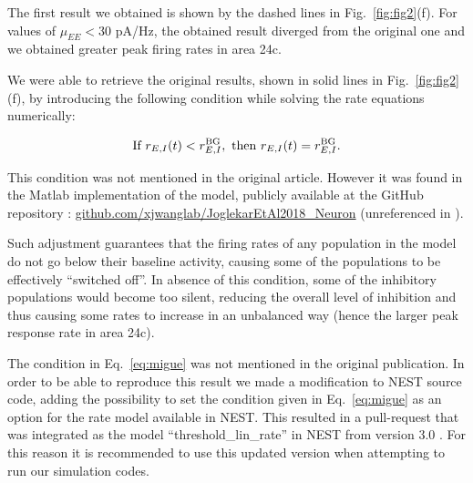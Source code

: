 The first result we obtained is shown by the dashed lines in Fig.~\ref{fig:fig2}(f). For values of $\mu_{EE} < 30$ pA/Hz, the obtained result diverged from the original one and we obtained greater peak firing rates in area 24c.

We were able to retrieve the original results, shown in solid lines in Fig.~\ref{fig:fig2}(f), by introducing the following condition while solving the rate equations numerically:

\begin{equation}
    \text{If } r_{E,I}(t) < r_{E,I}^{\rm BG}, \text{ then } r_{E,I}(t) = r_{E,I}^{\rm BG}.
    \label{eq:migue}
\end{equation}

This condition was not mentioned in the original article. However it was found in the Matlab implementation of the model, publicly available  at the GitHub repository : \href{github.com/xjwanglab/JoglekarEtAl2018_Neuron}{github.com/xjwanglab/JoglekarEtAl2018\_Neuron} (unreferenced in \cite{joglekar2018inter}).

Such adjustment guarantees that the firing rates of any population in the model do not go below their baseline activity, causing some of the populations to be effectively ``switched off''. In absence of this condition, some of the inhibitory populations would become too silent, reducing the overall level of inhibition and thus causing some rates to increase in an unbalanced way (hence the larger peak response rate in area 24c). 

The condition in Eq.~\ref{eq:migue} was not mentioned in the original publication. In order to be able to reproduce this result we made a modification to NEST source code, adding the possibility to set the condition given in Eq.~\ref{eq:migue} as an option for the rate model available in NEST. This resulted in a pull-request that was integrated as the model ``threshold\_lin\_rate'' in NEST from version 3.0 \cite{hahne_jan_2021_4739103}. For this reason it is recommended to use this updated version when attempting to run our simulation codes.


